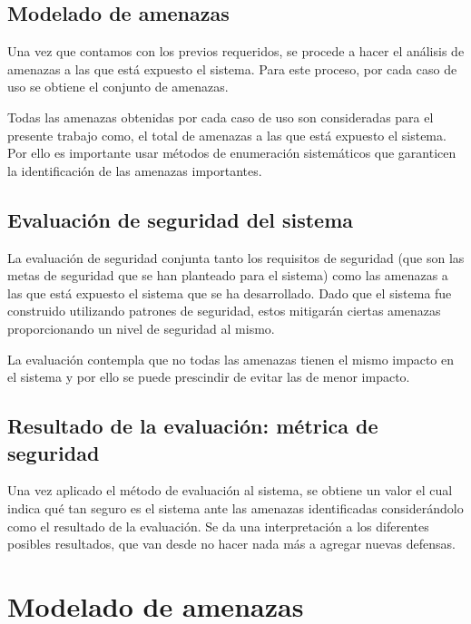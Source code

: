 \subsection*{Modelado de amenazas}

Una vez que contamos con los previos requeridos, se procede a hacer el análisis de amenazas a las que está expuesto el sistema. Para este proceso, por cada caso de uso se obtiene el conjunto de amenazas.

\vspace{0.3cm}

Todas las amenazas obtenidas por cada caso de uso son consideradas para el presente trabajo como, el total de amenazas a las que está expuesto el sistema. Por ello es importante usar métodos de enumeración sistemáticos que garanticen la identificación de las amenazas importantes.


\subsection*{Evaluación de seguridad del sistema}

La evaluación de seguridad conjunta tanto los requisitos de seguridad (que son las metas de seguridad que se han planteado para el sistema) como las amenazas a las que está expuesto el sistema que se ha desarrollado. Dado que el sistema fue construido utilizando patrones de seguridad, estos mitigarán ciertas amenazas proporcionando un nivel de seguridad al mismo. 

\vspace{0.3cm}

La evaluación contempla que no todas las amenazas tienen el mismo impacto en el sistema y por ello se puede prescindir de evitar las de menor impacto. 

\subsection*{Resultado de la evaluación: métrica de seguridad}

Una vez aplicado el método de evaluación al sistema, se obtiene un valor el cual indica qué tan seguro es el sistema ante las amenazas identificadas considerándolo como el resultado de la evaluación. Se da una interpretación a los diferentes posibles resultados, que van desde no hacer nada más a agregar nuevas defensas. 

\section{Modelado de amenazas}\label{cap4:sec:ModAme}

